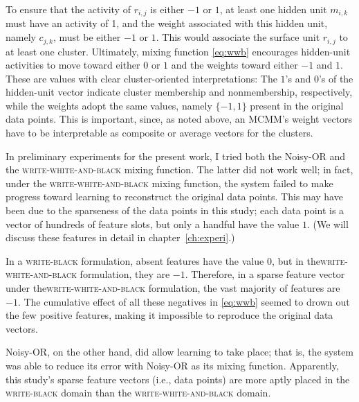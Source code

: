 To ensure that the activity of $r_{i,j}$ is either $-1$ or $1$, at least one hidden 
unit $m_{i,k}$ must have an activity of 1, and the weight associated with this 
hidden unit, namely $c_{j,k}$, must be either $-1$ or $1$. This would associate 
the surface unit $r_{i,j}$ to at least one cluster. Ultimately, mixing 
function \eqref{eq:wwb} encourages hidden-unit activities to move toward 
either $0$ or $1$ and the weights toward either $-1$ and $1$. These are 
values with clear cluster-oriented interpretations: The $1$'s and $0$'s of the 
hidden-unit vector indicate cluster membership and nonmembership, respectively, 
while the weights adopt the same values, namely $\{-1, 1\}$ present in the original data points. 
This is important, since, as noted above, an MCMM's weight vectors have to be 
interpretable as composite or average vectors for the clusters.

In preliminary experiments for the present work, I tried both the Noisy-OR 
and the \textsc{write-white-and-black} mixing function. The latter did 
not work well; in fact, under the \textsc{write-white-and-black} mixing function, the system 
failed to make progress toward learning to reconstruct the original 
data points. This may have been due to the sparseness of the data points 
in this study; each data point is a vector of hundreds of feature slots, but 
only a handful have the value $1$.
(We will discuss these features in detail in chapter~\ref{ch:experi}.)

In a \textsc{write-black} formulation, absent features have the value $0$, but in the\textsc{write-white-and-black} formulation, they are $-1$. Therefore, in a sparse feature vector under the\textsc{write-white-and-black} formulation, the vast majority of features are $-1$. The cumulative effect of all these negatives in \eqref{eq:wwb} seemed to drown out the few positive features, making it impossible to reproduce the original data vectors. 

Noisy-OR, on the other hand, did allow learning to take place; that is, 
the system was able to reduce its error with Noisy-OR as its mixing function. 
Apparently, this study's sparse feature vectors (i.e., data points) are more aptly 
placed in the \textsc{write-black} domain than the \textsc{write-white-and-black} domain.

